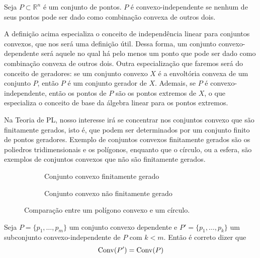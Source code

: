 \begin{def:independencia convexa}
	Seja $P \subset \mathbb{R}^n$ é um conjunto de pontos. $P$ é convexo-independente
	se nenhum de seus pontos pode ser dado como combinação convexa de outros dois.
\end{def:independencia convexa}

A definição acima especializa o conceito de independência linear para conjuntos convexos,
que nos será uma definição útil. Dessa forma, um conjunto convexo-dependente será aquele
no qual há pelo menos um ponto que pode ser dado como combinação convexa de outros dois.
Outra especialização que faremos será do conceito de geradores: se um conjunto convexo
$X$ é a envoltória convexa de um conjunto $P$, então $P$ é um conjunto gerador de $X$.
Ademais, se $P$ é convexo-independente, então os pontos de $P$ são os pontos extremos
de $X$, o que especializa o conceito de base da álgebra linear para os pontos extremos.

Na Teoria de PL, nosso interesse irá se concentrar nos conjuntos convexo que são
finitamente gerados, isto é, que podem ser determinados por um conjunto finito
de pontos geradores. Exemplo de conjuntos convexos finitamente gerados são
os poliedros tridimensionais e os polígonos, enquanto que o círculo, ou a esfera,
são exemplos de conjuntos convexos que não são finitamente gerados.

\begin{figure}[h]
\centering
\begin{subfigure}{0.45\textwidth}
	\centering
	\caption{Conjunto convexo finitamente gerado}
	\label{fig:poligono}
\end{subfigure}
\hfill
\begin{subfigure}{0.50\textwidth}
	\centering
	\caption{Conjunto convexo não finitamente gerado}
	\label{fig:circulo}
\end{subfigure}
\caption{Comparação entre um polígono convexo e um círculo.}
\end{figure}

\begin{prop:redundancia}
	Seja $P = \{p_1, \ldots, p_m\}$ um conjunto convexo dependente e
	$P' = \{p_1, \ldots, p_k\}$ um subconjunto convexo-independente
	de $P$ com $k < m$. Então é correto dizer que
	\begin{equation*}
		\mathrm{Conv}(P') = \mathrm{Conv}(P)
	\end{equation*}
\end{prop:redundancia}

